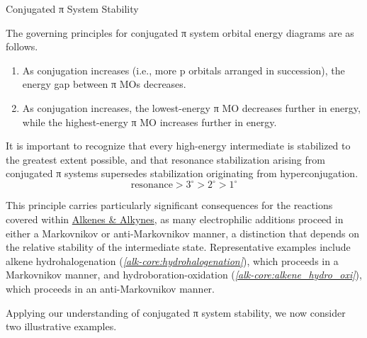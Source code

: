 \begin{core}{Conjugated π System Stability}
      \vspace{-0.4cm}

      The governing principles for conjugated π system orbital energy diagrams are as follows.

      \begin{enumerate}

        \item As conjugation increases (i.e., more p orbitals arranged in succession), the energy gap between π MOs decreases.

        \item As conjugation increases, the lowest-energy π MO decreases further in energy, while the highest-energy π MO increases further in energy.

      \end{enumerate}

      It is important to recognize that every high-energy intermediate is stabilized to the greatest extent possible, and that resonance stabilization arising from conjugated π systems supersedes stabilization originating from hyperconjugation.
      \[
        \text{resonance} > 3^\circ > 2^\circ > 1^\circ
      \]

      This principle carries particularly significant consequences for the reactions covered within \href{https://ibahng.github.io/chemistry/alkene_alkyne/alkene_alkyne.pdf}{Alkenes \& Alkynes}, as many electrophilic additions proceed in either a Markovnikov or anti-Markovnikov manner, a distinction that depends on the relative stability of the intermediate state. Representative examples include alkene hydrohalogenation (\textit{\autoref{alk-core:hydrohalogenation}}), which proceeds in a Markovnikov manner, and hydroboration-oxidation (\textit{\autoref{alk-core:alkene_hydro_oxi}}), which proceeds in an anti-Markovnikov manner.

    \end{core}

    Applying our understanding of conjugated π system stability, we now consider two illustrative examples.


